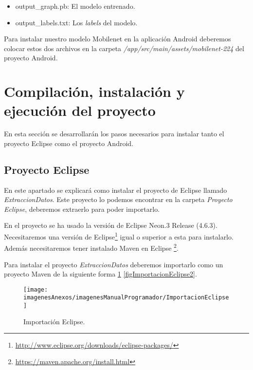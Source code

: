 \begin{itemize}
	\item output\_graph.pb: El modelo entrenado.
	\item output\_labels.txt: Los \textit{labels} del modelo.
\end{itemize}

Para instalar nuestro modelo Mobilenet en la aplicación Android deberemos colocar estos dos archivos en la carpeta \textit{/app/src/main/assets/mobilenet-224} del proyecto Android.

\section{Compilación, instalación y ejecución del proyecto}

En esta sección se desarrollarán los pasos necesarios para instalar tanto el proyecto Eclipse como el proyecto Android.

\subsection{Proyecto Eclipse}

En este apartado se explicará como instalar el proyecto de Eclipse llamado \textit{ExtraccionDatos}. Este proyecto lo podemos encontrar en la carpeta \textit{Proyecto Eclipse}, deberemos extraerlo para poder importarlo.

En el proyecto se ha usado la versión de Eclipse Neon.3 Release (4.6.3). Necesitaremos una versión de Eclipse\footnote{\url{http://www.eclipse.org/downloads/eclipse-packages/}} igual o superior a esta para instalarlo. Además necesitaremos tener instalado Maven en Eclipse \footnote{\url{https://maven.apache.org/install.html}}.

Para instalar el proyecto \textit{ExtraccionDatos} deberemos importarlo como un proyecto Maven de la siguiente forma \ref{figImportacionEclipse} \ref{figImportacionEclipse2}.

\begin{figure}[h]
    \begin{center}%
        \begin{center}%
          \texttt{[image: imagenesAnexos/imagenesManualProgramador/ImportacionEclipse]}%
          \caption{Importación Eclipse.}%
          \label{figImportacionEclipse}%
        \end{center}%
  	\end{center}%
\end{figure}%


